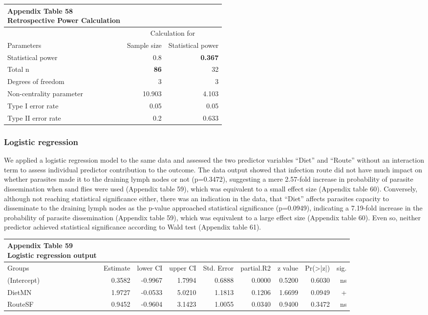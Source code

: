 \documentclass[
  12pt,
  letterpaper,
]{article}
\begin{document}
\begin{longtable}{l|rr}
\caption*{
{\large \textbf{Appendix Table 58}} \\ 
{\small \textbf{Retrospective Power Calculation}}
} \\ 
\toprule
\multicolumn{1}{l}{} & \multicolumn{2}{c}{Calculation for} \\ 
\cmidrule(lr){2-3}
\multicolumn{1}{l}{Parameters} & Sample size & Statistical power \\ 
\midrule\addlinespace[2.5pt]
Statistical power & 0.8 & \textbf{0.367} \\ 
Total n & \textbf{86} & 32 \\ 
Degrees of freedom & 3 & 3 \\ 
Non-centrality parameter & 10.903 & 4.103 \\ 
Type I error rate & 0.05 & 0.05 \\ 
Type II error rate & 0.2 & 0.633 \\ 
\bottomrule
\end{longtable}

\subsubsection{Logistic regression}\label{logistic-regression}

We applied a logistic regression model to the same data and assessed the two predictor variables ``Diet'' and ``Route'' without an interaction term to assess individual predictor contribution to the outcome. The data output showed that infection route did not have much impact on whether parasites made it to the draining lymph nodes or not (p=0.3472), suggesting a mere 2.57-fold increase in probability of parasite dissemination when sand flies were used (Appendix table 59), which was equivalent to a small effect size (Appendix table 60). Conversely, although not reaching statistical significance either, there was an indication in the data, that ``Diet'' affects parasites capacity to disseminate to the draining lymph nodes as the p-value approached statistical significance (p=0.0949), indicating a 7.19-fold increase in the probability of parasite dissemination (Appendix table 59), which was equivalent to a large effect size (Appendix table 60). Even so, neither predictor achieved statistical significance according to Wald test (Appendix table 61).

\begin{longtable}{l|rrrrrrrr}
\caption*{
{\large \textbf{Appendix Table 59}} \\ 
{\small \textbf{Logistic regression output}}
} \\ 
\toprule
\multicolumn{1}{l}{Groups} & Estimate & lower CI & upper CI & Std. Error & partial.R2 & z value & Pr(>|z|) & sig. \\ 
\midrule\addlinespace[2.5pt]
(Intercept) & 0.3582 & -0.9967 & 1.7994 & 0.6888 & 0.0000 & 0.5200 & 0.6030 & ns \\ 
DietMN & 1.9727 & -0.0533 & 5.0210 & 1.1813 & 0.1206 & 1.6699 & 0.0949 & + \\ 
RouteSF & 0.9452 & -0.9604 & 3.1423 & 1.0055 & 0.0340 & 0.9400 & 0.3472 & ns \\ 
\bottomrule
\end{longtable}
\end{document}
